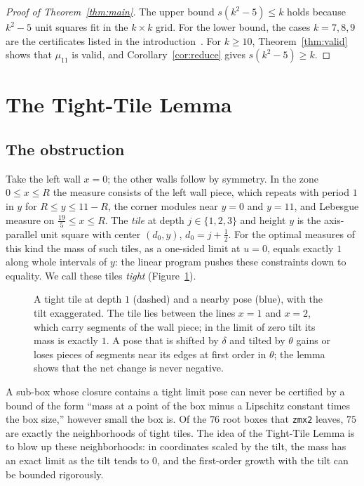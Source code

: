 \documentclass[11pt]{amsart}
\theoremstyle{definition}
\theoremstyle{remark}
\begin{document}
\begin{proof}[Proof of Theorem~\ref{thm:main}]
The upper bound $s(k^2-5)\le k$ holds because $k^2-5$ unit squares fit in the $k\times k$ grid. For the lower bound,
the cases $k=7,8,9$ are the certificates listed in the introduction~\cite{s44,hosono59,greff76}. For $k\ge10$,
Theorem~\ref{thm:valid} shows that $\mu_{11}$ is valid, and Corollary~\ref{cor:reduce} gives $s(k^2-5)\ge k$.
\end{proof}

\section{The Tight-Tile Lemma}\label{sec:tt}

\subsection{The obstruction}
Take the left wall $x=0$; the other walls follow by symmetry. In the zone $0\le x\le R$ the measure consists of the
left wall piece, which repeats with period $1$ in $y$ for $R\le y\le11-R$, the corner modules near $y=0$ and $y=11$,
and Lebesgue measure on $\frac{19}5\le x\le R$. The \emph{tile} at depth $j\in\{1,2,3\}$ and
height $y$ is the axis-parallel unit square with center $(d_0,y)$, $d_0=j+\frac12$. For the optimal measures of this kind the
mass of such tiles, as a one-sided limit at $u=0$, equals exactly $1$ along whole intervals of $y$: the linear program
pushes these constraints down to equality. We call
these tiles \emph{tight} (Figure~\ref{fig:tile}).

\begin{figure}[ht]
\centering
\caption{A tight tile at depth $1$ (dashed) and a nearby pose (blue), with the tilt exaggerated. The tile lies
between the lines $x=1$ and $x=2$, which carry segments of the wall piece; in the limit of zero tilt its mass is exactly
$1$. A pose that is shifted by $\delta$ and tilted by $\theta$ gains or loses pieces of segments near its edges at first
order in $\theta$; the lemma shows that the net change is never negative.}
\label{fig:tile}
\end{figure}

A sub-box whose closure contains a tight limit pose can never be certified by a bound of the form ``mass at a point
of the box minus a Lipschitz constant times the box size,'' however small the box is. Of the $76$ root boxes that
\texttt{zmx2} leaves, $75$ are exactly the neighborhoods of tight tiles. The idea of the Tight-Tile Lemma is to
blow up these neighborhoods: in coordinates scaled by the tilt, the mass has an exact limit as the tilt tends to
$0$, and the first-order growth with the tilt can be bounded rigorously.
\end{document}
